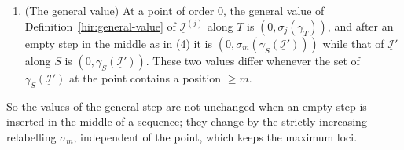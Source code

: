 \begin{lemma}
\begin{enumerate}
\(\gamma=\sigma_m\circ\gamma_S(\underline{\mathcal I}')\), \(\nu=\nu_S(\underline{\mathcal I}')\), the cosupport is that of \(\underline{\mathcal I}'_S\) and the maximum loci of \(\gamma\) agree. If \(N\)
and the members of \(\underline{\mathcal I}_{T_0}\) are closed, \(\underline{\mathcal I}'\) is restricted-equivalent to \(\sigma^*\underline{\mathcal I}_{T_0}\), and (for coherent ideals)
\(\gamma_S(\underline{\mathcal I}')=\gamma_S(\sigma^*\underline{\mathcal I}_{T_0})\).
\item (The general value) At a point of order \(0\), the general value of Definition~\ref{hir:general-value} of \(\underline{\mathcal I}^{(j)}\) along \(T\) is
\((0,\sigma_j(\gamma_T))\), and after an empty step in the middle as in (4) it is \((0,\sigma_m(\gamma_S(\underline{\mathcal I}')))\) while that of \(\underline{\mathcal I}'\) along \(S\) is
\((0,\gamma_S(\underline{\mathcal I}'))\). These two values differ whenever the set of \(\gamma_S(\underline{\mathcal I}')\) at the point contains a position \(\ge m\).
\end{enumerate}
So the values of the general step are not unchanged when an empty step is inserted in the middle of a sequence; they change by the strictly increasing
relabelling \(\sigma_m\), independent of the point, which keeps the maximum loci.
\end{lemma}
